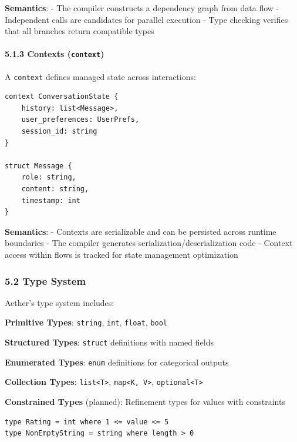 \documentclass[
]{article}
\newcommand{\passthrough}[1]{#1}
\begin{document}
\textbf{Semantics}: - The compiler constructs a dependency graph from
data flow - Independent calls are candidates for parallel execution -
Type checking verifies that all branches return compatible types

\paragraph{\texorpdfstring{5.1.3 Contexts
(\texttt{context})}{5.1.3 Contexts (context)}}\label{contexts-context}

A \passthrough{\lstinline!context!} defines managed state across
interactions:

\begin{lstlisting}
context ConversationState {
    history: list<Message>,
    user_preferences: UserPrefs,
    session_id: string
}

struct Message {
    role: string,
    content: string,
    timestamp: int
}
\end{lstlisting}

\textbf{Semantics}: - Contexts are serializable and can be persisted
across runtime boundaries - The compiler generates
serialization/deserialization code - Context access within flows is
tracked for state management optimization

\subsubsection{5.2 Type System}\label{type-system}

Aether's type system includes:

\textbf{Primitive Types}: \passthrough{\lstinline!string!},
\passthrough{\lstinline!int!}, \passthrough{\lstinline!float!},
\passthrough{\lstinline!bool!}

\textbf{Structured Types}: \passthrough{\lstinline!struct!} definitions
with named fields

\textbf{Enumerated Types}: \passthrough{\lstinline!enum!} definitions
for categorical outputs

\textbf{Collection Types}: \passthrough{\lstinline!list<T>!},
\passthrough{\lstinline!map<K, V>!},
\passthrough{\lstinline!optional<T>!}

\textbf{Constrained Types} (planned): Refinement types for values with
constraints

\begin{lstlisting}
type Rating = int where 1 <= value <= 5
type NonEmptyString = string where length > 0
\end{lstlisting}
\end{document}
